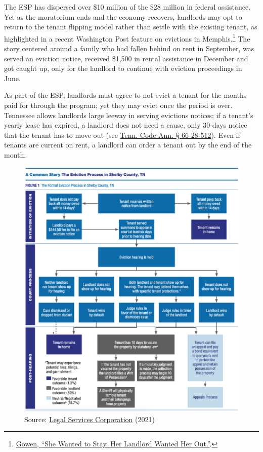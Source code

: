 \documentclass[
  openany]{book}
\begin{document}
The ESP has dispersed over \$10 million of the \$28 million in federal assistance. Yet as the moratorium ends and the economy recovers, landlords may opt to return to the tenant flipping model rather than settle with the existing tenant, as highlighted in a recent Washington Post feature on evictions in Memphis.\footnote{\protect\hyperlink{ref-gowen2021}{Gowen, {``She Wanted to Stay. Her Landlord Wanted Her Out.''}}.} The story centered around a family who had fallen behind on rent in September, was served an eviction notice, received \$1,500 in rental assistance in December and got caught up, only for the landlord to continue with eviction proceedings in June.

As part of the ESP, landlords must agree to not evict a tenant for the months paid for through the program; yet they may evict once the period is over. Tennessee allows landlords large leeway in serving evictions notices; if a tenant's yearly lease has expired, a landlord does not need a cause, only 30-days notice that the tenant has to move out (see \href{http://law.justia.com/codes/tennessee/2010/title-66/chapter-28/part-5/66-28-512}{Tenn. Code Ann. § 66-28-512}). Even if tenants are current on rent, a landlord can order a tenant out by the end of the month.

\begin{figure}
\centering
\includegraphics{_img/LSC-shelby-evict.png}
\caption{Source: \href{https://www.lsc.gov/press-release/new-nationwide-lsc-eviction-study-examines-variations-local-laws-and-highlights}{Legal Services Corporation} (2021)}
\end{figure}
\end{document}
